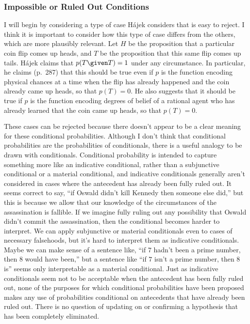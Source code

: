\subsubsection{Impossible or Ruled Out Conditions}

I will begin by considering a type of case H\'{a}jek considers that is easy to reject. I think it is important to consider how this type of case differs from the others, which are more plausibly relevant. Let $H$ be the proposition that a particular coin flip comes up heads, and $T$ be the proposition that this same flip comes up tails. H\'{a}jek claims that $p(T \given T)=1$ under any circumstance. In particular, he claims (p.\ 287) that this should be true even if $p$ is the function encoding physical chances at a time when the flip has already happened and the coin already came up heads, so that $p(T)=0$. He also suggests that it should be true if $p$ is the function encoding degrees of belief of a rational agent who has already learned that the coin came up heads, so that $p(T)=0$.

These cases can be rejected because there doesn't appear to be a clear meaning for these conditional probabilities. Although I don't think that conditional probabilities are the probabilities of conditionals, there is a useful analogy to be drawn with conditionals. Conditional probability is intended to capture something more like an indicative conditional, rather than a subjunctive conditional or a material conditional, and indicative conditionals generally aren't considered in cases where the antecedent has already been fully ruled out. It seems correct to say, ``if Oswald didn't kill Kennedy then someone else did,'' but this is because we allow that our knowledge of the circumstances of the assassination is fallible. If we imagine fully ruling out any possibility that Oswald didn't commit the assassination, then the conditional becomes harder to interpret. We can apply subjunctive or material conditionals even to cases of necessary falsehoods, but it's hard to interpret them as indicative conditionals. Maybe we can make sense of a sentence like, ``if $7$ hadn't been a prime number, then $8$ would have been,'' but a sentence like ``if $7$ isn't a prime number, then $8$ is'' seems only interpretable as a material conditional. Just as indicative conditionals seem not to be acceptable when the antecedent has been fully ruled out, none of the purposes for which conditional probabilities have been proposed makes any use of probabilities conditional on antecedents that have already been ruled out. There is no question of updating on or confirming a hypothesis that has been completely eliminated.


